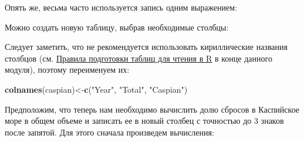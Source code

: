 \documentclass[]{book}
\newenvironment{Shaded}{\begin{snugshade}}{\end{snugshade}}
\newcommand{\KeywordTok}[1]{\textcolor[rgb]{0.13,0.29,0.53}{\textbf{#1}}}
\newcommand{\DecValTok}[1]{\textcolor[rgb]{0.00,0.00,0.81}{#1}}
\newcommand{\StringTok}[1]{\textcolor[rgb]{0.31,0.60,0.02}{#1}}
\newcommand{\OperatorTok}[1]{\textcolor[rgb]{0.81,0.36,0.00}{\textbf{#1}}}
\newcommand{\NormalTok}[1]{#1}
\begin{document}
Опять же, весьма часто используется запись одним выражением:

\begin{Shaded}
\end{Shaded}

Можно создать новую таблицу, выбрав необходимые столбцы:

\begin{Shaded}
\end{Shaded}

Следует заметить, что не рекомендуется использовать кириллические
названия столбцов (см. \protect\hyperlink{table_rules}{Правила
подготовки таблиц для чтения в R} в конце данного модуля), поэтому
переименуем их:

\begin{Shaded}
\begin{Highlighting}[]
\KeywordTok{colnames}\NormalTok{(caspian)<-}\KeywordTok{c}\NormalTok{(}\StringTok{"Year"}\NormalTok{, }\StringTok{"Total"}\NormalTok{, }\StringTok{"Caspian"}\NormalTok{)}
\end{Highlighting}
\end{Shaded}

Предположим, что теперь нам необходимо вычислить долю сбросов в
Каспийское море в общем объеме и записать ее в новый столбец с точностью
до 3 знаков после запятой. Для этого сначала произведем вычисления:

\begin{Shaded}
\end{Shaded}
\end{document}
